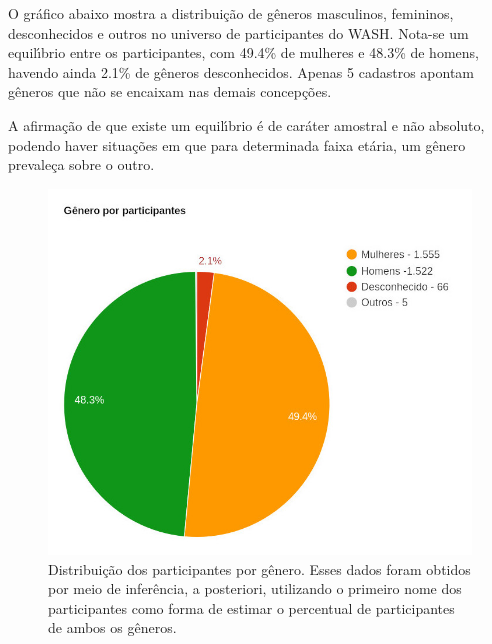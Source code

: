 \documentclass[
12pt,		%
openright,	%
twoside,  %
a4paper,			%
chapter=TITLE,		%
english,			%
french,				%
spanish,			%
brazil				%
]{USPSC-classe/USPSC}
\begin{document}
O gr\'afico abaixo mostra a distribui\c{c}\~ao de g\^eneros masculinos, femininos, desconhecidos e outros no universo de participantes do WASH. Nota-se um equil\'{\i}brio entre os participantes, com 49.4\% de mulheres e 48.3\% de homens, havendo ainda 2.1\% de g\^eneros desconhecidos. Apenas 5 cadastros apontam g\^eneros que n\~ao se encaixam nas demais concep\c{c}\~oes.









A afirma\c{c}\~ao de que existe um equil\'{\i}brio \'e de car\'ater amostral e n\~ao absoluto, podendo haver situa\c{c}\~oes em que para determinada faixa et\'aria, um g\^enero prevale\c{c}a sobre o outro.











\captionsetup{format=plain}
\begin{figure}[max size={\textwidth}{\textheight}]

\centering


\begin{minipage}[b]{0.4\linewidth}
        \centering
                \includegraphics[width=1.0\linewidth]{../../imagens/genero-todos-crop.jpeg}
                \caption{Distribui\c{c}\~ao dos participantes por g\^enero. Esses dados foram obtidos por meio de infer\^encia, a posteriori, utilizando o primeiro nome dos participantes como forma de estimar o percentual de participantes de ambos os g\^eneros.}
                \label{ef11d820efb73d78fb64eb6bdd03853471a8e89f}
\end{minipage}%
\hspace{0.5cm}
\end{figure}
\end{document}
